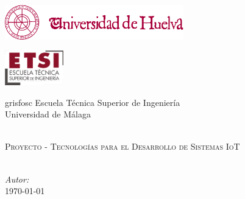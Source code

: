 \begin{titlepage}
\begin{center}

\begin{minipage}{0.49\linewidth}
\begin{flushleft}
\includegraphics[height=1.5cm]{./images/logo_uhu}
\end{flushleft}
\end{minipage}
\begin{minipage}{0.49\linewidth}
\begin{flushright}
\includegraphics[height=1.5cm]{./images/logo_etsi}
\end{flushright}
\end{minipage}

\vspace{2cm}

\begin{color}{grisfosc}
\large
Escuela Técnica Superior de Ingeniería\\[0.2cm]
Universidad de Málaga\\[1.9cm]
\end{color}

{\LARGE \bfseries \titulo}\\[1.5cm]
\textsc{\large Proyecto - Tecnologías para el Desarrollo de Sistemas IoT }\\[0.4cm]
\textcolor{grisclar}{\large\titulacion}\\[5.0cm]

\begin{flushright} \large
\emph{Autor:} \autor\\[0.4cm]
\today
\end{flushright}


\end{center}

\end{titlepage}
